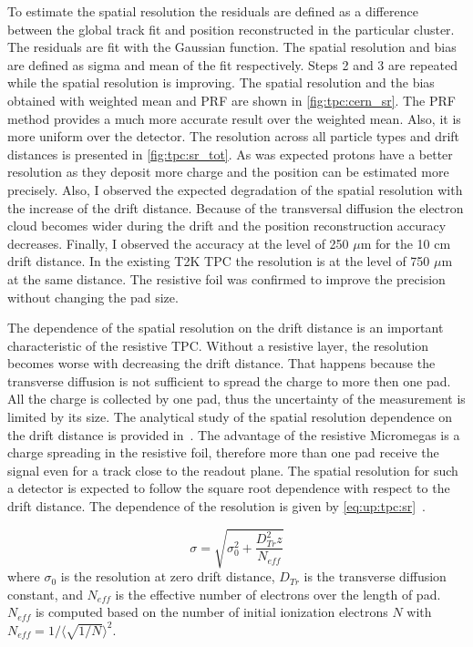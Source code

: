 \documentclass[../main.tex]{subfiles}
\begin{document}
To estimate the spatial resolution the residuals are defined as a difference between the global track fit and position reconstructed in the particular cluster. The residuals are fit with the Gaussian function. The spatial resolution and bias are defined as sigma and mean of the fit respectively. Steps 2 and 3 are repeated while the spatial resolution is improving. The spatial resolution and the bias obtained with weighted mean and PRF are shown in \autoref{fig:tpc:cern_sr}. The PRF method provides a much more accurate result over the weighted mean. Also, it is more uniform over the detector. The resolution across all particle types and drift distances is presented in \autoref{fig:tpc:sr_tot}. As was expected protons have a better resolution as they deposit more charge and the position can be estimated more precisely. Also, I observed the expected degradation of the spatial resolution with the increase of the drift distance. Because of the transversal diffusion the electron cloud becomes wider during the drift and the position reconstruction accuracy decreases. Finally, I observed the accuracy at the level of 250 $\mu\text{m}$ for the 10 cm drift distance. In the existing T2K TPC the resolution is at the level of 750 $\mu\text{m}$ at the same distance. The resistive foil was confirmed to improve the precision without changing the pad size.

The dependence of the spatial resolution on the drift distance is an important characteristic of the resistive TPC. Without a resistive layer, the resolution becomes worse with decreasing the drift distance. That happens because the transverse diffusion is not sufficient to spread the charge to more then one pad. All the charge is collected by one pad, thus the uncertainty of the measurement is limited by its size. The analytical study of the spatial resolution dependence on the drift distance is provided in~\cite{Arogancia2009}. The advantage of the resistive Micromegas is a charge spreading in the resistive foil, therefore more than one pad receive the signal even for a track close to the readout plane. The spatial resolution for such a detector is expected to follow the square root dependence with respect to the drift distance. The dependence of the resolution is given by \autoref{eq:up:tpc:sr}~\cite{Dixit2007}.

\begin{equation}
\label{eq:up:tpc:sr}
  \sigma=\sqrt{\sigma_0^2+\frac{D^2_{Tr}z}{N_{eff}}}
\end{equation}
where $\sigma_0$ is the resolution at zero drift distance, $D_{Tr}$ is the transverse diffusion constant, and $N_{eff}$ is the effective number of electrons over the length of pad. $N_{eff}$ is computed based on the number of initial ionization electrons $N$ with $N_{eff}=1/\langle\sqrt{1/N}\rangle^2$.
\end{document}
